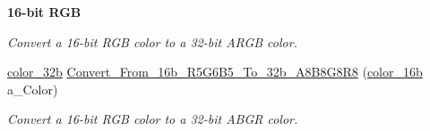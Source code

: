 \begin{Indent}{\bf 16-\/bit RGB}
\begin{DoxyCompactItemize}
\begin{DoxyCompactList}\small\item\em Convert a 16-\/bit RGB color to a 32-\/bit ARGB color. \item\end{DoxyCompactList}\item 
\hyperlink{namespacetil_a8eb2d871b8a6ffb55b3eeb720207a6cb}{color\_\-32b} \hyperlink{namespacetil_a136075678006abfa91e534eeb9049f9c}{Convert\_\-From\_\-16b\_\-R5G6B5\_\-To\_\-32b\_\-A8B8G8R8} (\hyperlink{namespacetil_a952afde951048a62d0f970dc6ca89a45}{color\_\-16b} a\_\-Color)
\begin{DoxyCompactList}\small\item\em Convert a 16-\/bit RGB color to a 32-\/bit ABGR color. \item\end{DoxyCompactList}\end{DoxyCompactItemize}
\end{Indent}
